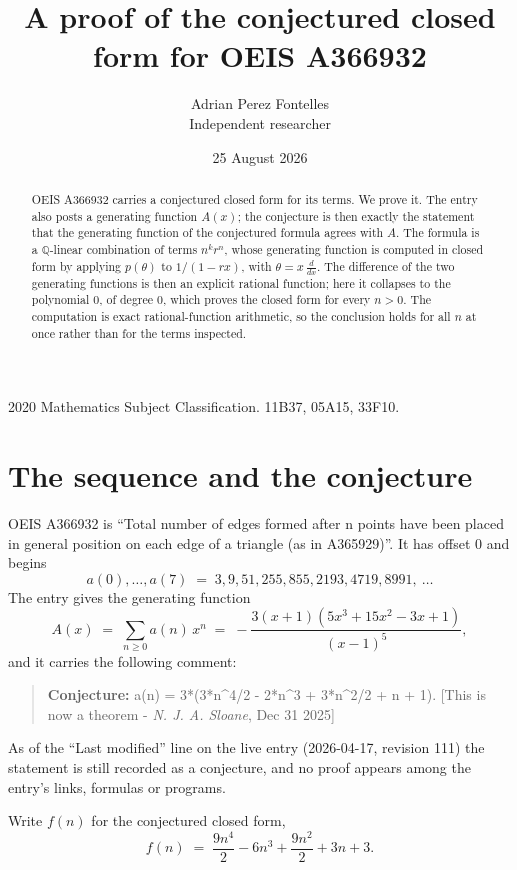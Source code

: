 \documentclass[11pt,a4paper]{article}
\title{A proof of the conjectured closed form for OEIS A366932}
\author{Adrian Perez Fontelles\\ \small Independent researcher}
\date{25 August 2026}
\theoremstyle{plain}
\theoremstyle{definition}
\begin{document}
\maketitle

\begin{abstract}
OEIS A366932 carries a conjectured closed form for its terms. We prove it. The entry
also posts a generating function $A(x)$; the conjecture is then exactly the statement
that the generating function of the conjectured formula agrees with $A$. The formula is
a $\mathbb{Q}$-linear combination of terms $n^{k}r^{n}$, whose generating function is
computed in closed form by applying $p(\theta)$ to $1/(1-rx)$, with
$\theta=x\,\frac{d}{dx}$. The difference of the two generating functions is then an
explicit rational function; here it collapses to the polynomial $0$, of degree
$0$, which proves the closed form for every $n>0$. The computation is exact
rational-function arithmetic, so the conclusion holds for all $n$ at once rather than
for the terms inspected.
\end{abstract}

\noindent\small 2020 Mathematics Subject Classification. 11B37, 05A15, 33F10.\normalsize

\section{The sequence and the conjecture}

OEIS A366932 is ``Total number of edges formed after n points have been placed in general position on each edge of a triangle (as in A365929)''. It has offset $0$ and begins
\[
a(0),\dots,a(7)\;=\;3, 9, 51, 255, 855, 2193, 4719, 8991,\ \dots
\]
The entry gives the generating function
\begin{equation}\label{eq:gf}
A(x)\;=\;\sum_{n\ge 0} a(n)\,x^{n}\;=\;- \frac{3 \left(x + 1\right) \left(5 x^{3} + 15 x^{2} - 3 x + 1\right)}{\left(x - 1\right)^{5}} ,
\end{equation}
and it carries the following comment:
\begin{quote}\small
\textbf{Conjecture:} a(n) = 3*(3*n\^{}4/2 - 2*n\^{}3 + 3*n\^{}2/2 + n + 1). [This is now a theorem - \emph{N. J. A. Sloane}, Dec 31 2025]
\end{quote}
As of the ``Last modified'' line on the live entry (2026-04-17, revision 111) the
statement is still recorded as a conjecture, and no proof appears among the entry's links,
formulas or programs.

Write $f(n)$ for the conjectured closed form,
\[
f(n)\;=\;\frac{9 n^{4}}{2} - 6 n^{3} + \frac{9 n^{2}}{2} + 3 n + 3 .
\]
\end{document}
